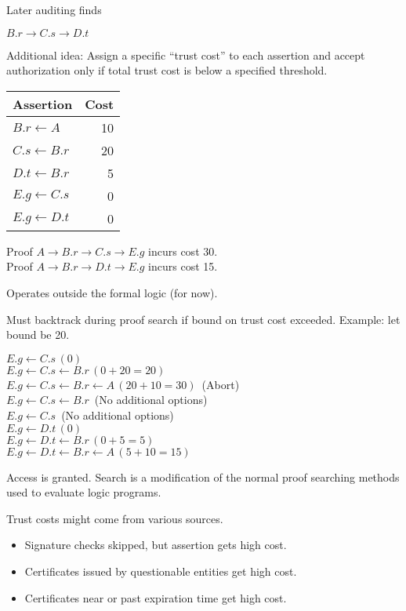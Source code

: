 \documentclass[landscape]{slides}
\begin{document}
Later auditing finds

\begin{center}$B.r \rightarrow C.s \rightarrow D.t$\end{center}
\stopslide

Additional idea: Assign a specific ``trust cost'' to each assertion and accept authorization only if total trust cost is below a specified threshold.

\begin{tabular}{|l|r|} \hline
Assertion & Cost \\ \hline
$B.r \leftarrow A$   & 10\\
$C.s \leftarrow B.r$ & 20\\
$D.t \leftarrow B.r$ &  5\\
$E.g \leftarrow C.s$ &  0\\
$E.g \leftarrow D.t$ &  0\\ \hline
\end{tabular}

Proof $A \rightarrow B.r \rightarrow C.s \rightarrow E.g$ incurs cost 30.\\
Proof $A \rightarrow B.r \rightarrow D.t \rightarrow E.g$ incurs cost 15.

Operates outside the formal logic (for now).
\stopslide

Must backtrack during proof search if bound on trust cost exceeded. Example: let bound be 20.

$E.g \leftarrow C.s\, (0)$\\
$E.g \leftarrow C.s \leftarrow B.r\, (0 + 20 = 20)$\\
$E.g \leftarrow C.s \leftarrow B.r \leftarrow A\, (20 + 10 = 30)$\, (Abort)\\
$E.g \leftarrow C.s \leftarrow B.r$\, (No additional options)\\
$E.g \leftarrow C.s$\, (No additional options)\\
$E.g \leftarrow D.t\, (0)$\\
$E.g \leftarrow D.t \leftarrow B.r\, (0 + 5 = 5)$\\
$E.g \leftarrow D.t \leftarrow B.r \leftarrow A\, (5 + 10 = 15)$

Access is granted. Search is a modification of the normal proof searching methods used to evaluate logic programs.
\stopslide

Trust costs might come from various sources.
\begin{itemize}
\item Signature checks skipped, but assertion gets high cost.
\item Certificates issued by questionable entities get high cost.
\item Certificates near or past expiration time get high cost.
\end{itemize}
\end{document}
